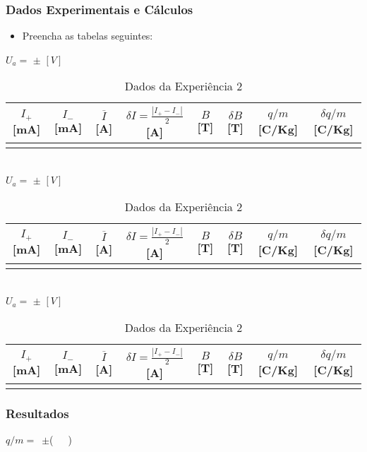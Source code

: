 \documentclass[a4paper,12pt]{article}  %
\begin{document}
\subsubsection{\sf Dados Experimentais e Cálculos}

\begin{itemize}
\item Preencha as tabelas seguintes:
\end{itemize}
\begin{table}[!hbp]
	\centering
	\noindent	$U_a =$ \underline{\makebox[1.5cm][r]{~}} $\pm$ \underline{\makebox[1cm][r]{~}} $[V]$ \\
	\begin{tabular}{|c|c|c|c|c|c|c|c|}
	\hline
	 $I_+$ [mA] & $I_-$ [mA] & $\overline{I}$ [A]	& $\delta I = \frac{| I_+ - I_-|}{2}$ [A] & $B$ [T] & $\delta B$  [T] & $q/m$ [C/Kg] & $\delta q/m$ [C/Kg] \\
	\hline
	 &  &  & &  &  & & \\
	 \hline
 	\end{tabular}\\[10pt]
	\noindent	$U_a =$ \underline{\makebox[1.5cm][r]{~}} $\pm$ \underline{\makebox[1cm][r]{~}} $[V]$ \\
	\begin{tabular}{|c|c|c|c|c|c|c|c|}
	\hline
	 $I_+$ [mA] & $I_-$ [mA] & $\overline{I}$ [A]	& $\delta I = \frac{| I_+ - I_-|}{2}$ [A] & $B$ [T] & $\delta B$  [T] & $q/m$ [C/Kg] & $\delta q/m$ [C/Kg] \\
	\hline
	 &  &  & &  &  & & \\
	 \hline
 	\end{tabular}\\[10pt]
	\noindent	$U_a =$ \underline{\makebox[1.5cm][r]{~}} $\pm$ \underline{\makebox[1cm][r]{~}} $[V]$ \\
	\begin{tabular}{|c|c|c|c|c|c|c|c|}
	\hline
	 $I_+$ [mA] & $I_-$ [mA] & $\overline{I}$ [A]	& $\delta I = \frac{| I_+ - I_-|}{2}$ [A] & $B$ [T] & $\delta B$  [T] & $q/m$ [C/Kg] & $\delta q/m$ [C/Kg] \\
	\hline
	 &  &  & &  &  & & \\
	 \hline
 	\end{tabular}
	
	\caption{Dados da Experiência 2} 
	\label{tab:Dados2}
\end{table}

\subsubsection{\sf Resultados}
\noindent  $q/m =$~\underline{\makebox[1.5cm][r]{~}}$\pm$\underline{\makebox[1cm][r]{~}}(~~~)\\
\end{document}
